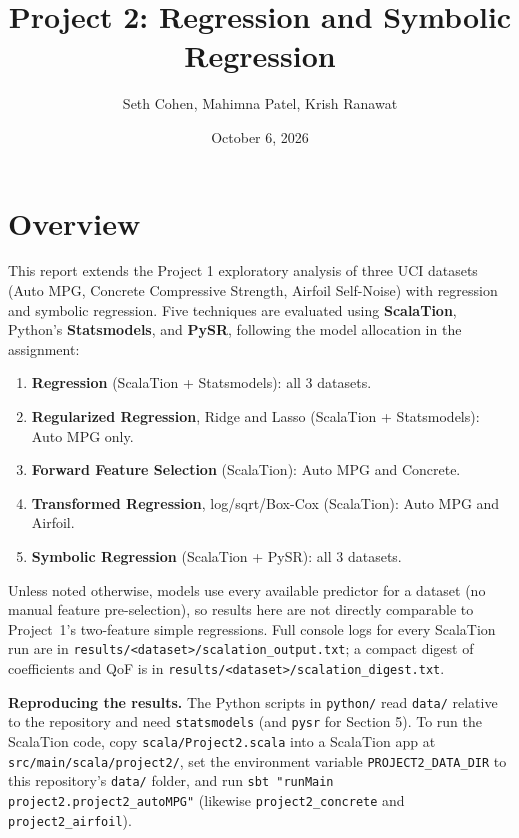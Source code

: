 \documentclass[11pt]{article}
\title{Project 2: Regression and Symbolic Regression}
\author{Seth Cohen, Mahimna Patel, Krish Ranawat}
\date{October 6, 2026}
\begin{document}
\maketitle

\section*{Overview}
This report extends the Project 1 exploratory analysis of three UCI datasets
(Auto MPG, Concrete Compressive Strength, Airfoil Self-Noise) with regression
and symbolic regression. Five techniques are evaluated using
\textbf{ScalaTion}, Python's \textbf{Statsmodels}, and \textbf{PySR}, following
the model allocation in the assignment:
\begin{enumerate}
    \item \textbf{Regression} (ScalaTion + Statsmodels): all 3 datasets.
    \item \textbf{Regularized Regression}, Ridge and Lasso (ScalaTion +
    Statsmodels): Auto MPG only.
    \item \textbf{Forward Feature Selection} (ScalaTion): Auto MPG and
    Concrete.
    \item \textbf{Transformed Regression}, log/sqrt/Box-Cox (ScalaTion): Auto
    MPG and Airfoil.
    \item \textbf{Symbolic Regression} (ScalaTion + PySR): all 3 datasets.
\end{enumerate}
Unless noted otherwise, models use every available predictor for a dataset
(no manual feature pre-selection), so results here are not directly comparable
to Project~1's two-feature simple regressions. Full console logs for every
ScalaTion run are in \texttt{results/<dataset>/scalation\_output.txt}; a
compact digest of coefficients and QoF is in
\texttt{results/<dataset>/scalation\_digest.txt}.

\begin{sloppypar}
\textbf{Reproducing the results.} The Python scripts in \texttt{python/} read
\texttt{data/} relative to the repository and need \texttt{statsmodels} (and
\texttt{pysr} for Section 5). To run the ScalaTion code, copy
\texttt{scala/Project2.scala} into a ScalaTion app at
\texttt{src/main/scala/project2/}, set the environment variable
\texttt{PROJECT2\_DATA\_DIR} to this repository's \texttt{data/} folder, and
run \texttt{sbt "runMain project2.project2\_autoMPG"} (likewise
\texttt{project2\_concrete} and \texttt{project2\_airfoil}).
\end{sloppypar}
\end{document}
